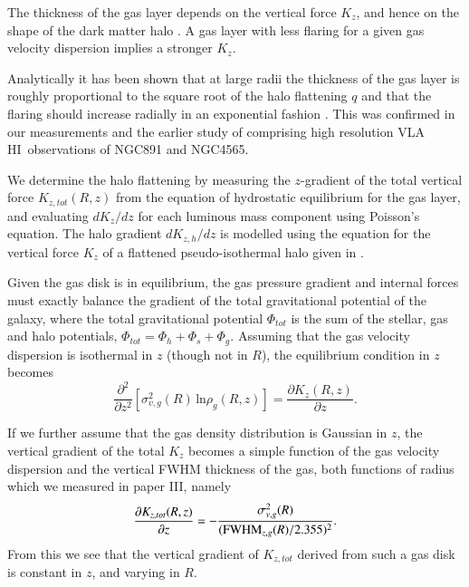 \documentclass[traditabstract]{aa} %
\newcommand\HI{H{\small I}}
\begin{document}
The thickness of the gas layer depends on the vertical force $K_z$,
and hence on the shape of the dark matter halo
\citep{maloney1992,ovg1992,khg1993,maloney1993}. A gas layer with
less flaring for a given gas velocity dispersion implies a stronger
$K_z$.

Analytically it has been shown that at large radii the thickness of the gas
layer is roughly proportional to the square root of the halo
flattening $q$ \citep{maloney1993,olling1995} and that the flaring
should increase radially in an exponential fashion
\citep{vdkruit1981}. This was confirmed in our measurements and
the earlier study of  \citet{rupen1991}
comprising high resolution VLA \HI\ observations of NGC891 and NGC4565.

We determine the halo flattening by measuring the $z$-gradient of the
total vertical force $K_{z,tot}(R,z)$ from the equation of hydrostatic
equilibrium for the gas layer, and evaluating $dK_z/dz$ for each
luminous mass component using Poisson's equation. The halo gradient
$dK_{z,h}/dz$ is modelled using the equation for the vertical force
$K_z$ of a flattened pseudo-isothermal halo given in \citet{srjf1994}.

Given the gas disk is in equilibrium, the gas pressure
gradient and internal forces must exactly balance the gradient of the 
total gravitational potential of the galaxy, 
where the total gravitational potential $\Phi_{tot}$ is the sum 
of the stellar, gas and halo potentials, $\Phi_{tot} =
\Phi_h + \Phi_s + \Phi_g$.  Assuming that the gas velocity dispersion 
is isothermal in $z$ (though
not in $R$), the equilibrium condition in $z$ becomes 
\begin{equation}
  \frac{\partial ^2}{\partial z^2} [\sigma_{v,g}^2(R) \, \mathrm{ln} \rho_g(R,z)]
    =   \frac{\partial K_z(R,z)}{\partial z}.
\end{equation}

If we further assume that the gas density distribution is
Gaussian in $z$, the vertical gradient of the total $K_z$ becomes
a simple function of the gas velocity dispersion and the vertical
FWHM thickness of the gas, both functions of radius which we
measured in paper III, namely
\begin{equation}
\frac{\partial K_{z,tot}(R,z)}{\partial z} = - 
  \frac{\sigma_{v,g}^2(R) }{ ({\rm FWHM}_{z,g}(R)/2.355)^2}.
\label{eqn:total_gradient}
\end{equation}
From this we see that the vertical gradient of $K_{z,tot}$ derived
from such a gas disk is constant in $z$, and varying in $R$. 
\end{document}
